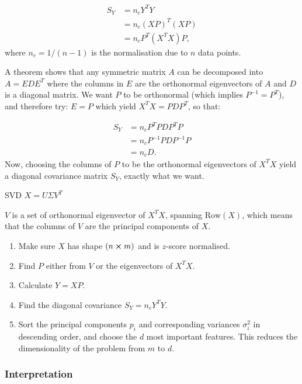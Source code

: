     \begin{align}
        S_Y &= n_cY^TY\nonumber\\
        &= n_c(XP)^T(XP) \nonumber\\
        &= n_cP^T(X^TX)P,
    \end{align} 
    where $n_c = 1/(n-1)$ is the normalisation due to $n$ data points.

    A theorem shows that any symmetric matrix $A$ can be decomposed into $A=EDE^T$ where the columns in $E$ are the orthonormal eigenvectors of $A$ and $D$ is a diagonal matrix. We want $P$ to be orthonormal (which implies $P^{-1}=P^T$), and therefore try: $E=P$ which yield $X^TX=PDP^T$, so that:

    \begin{align}
        S_Y &= n_cP^TPDP^TP\nonumber\\
        &= n_cP^{-1}PDP^{-1}P\nonumber\\
        &= n_cD.
    \end{align}
    Now, choosing the columns of $P$ to be the orthonormal eigenvectors of $X^TX$ yield a diagonal covariance matrix $S_Y$, exactly what we want. 

    SVD $X=U\Sigma V^T$
    
    $V$ is a set of orthonormal eigenvector of $X^TX$, spanning $\mathrm{Row}(X)$, which means that the columns of $V$ are the principal components of $X$. 
    
    
    \begin{enumerate}
        \item Make sure $X$ has shape $(n\cross m)$ and is $z$-score normalised.
        \item Find $P$ either from $V$ or the eigenvectors of $X^TX$.
        \item Calculate $Y=XP$.
        \item Find the diagonal covariance $S_Y=n_cY^TY$.
        \item Sort the principal components $p_i$ and corresponding variances $\sigma^2_i$ in descending order, and choose the $d$ most important features. This reduces the dimensionality of the problem from $m$ to $d$.
    \end{enumerate}
    
    \subsubsection{Interpretation}


